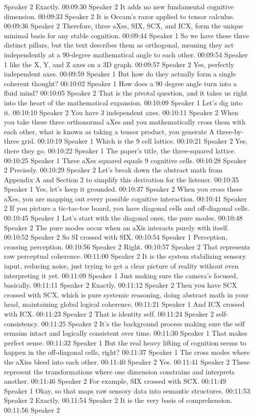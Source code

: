 Speaker 2 Exactly. 00:09:30 Speaker 2 It adds no new fundamental cognitive dimension. 00:09:33 Speaker 2 It is Occam's razor applied to tensor calculus. 00:09:36 Speaker 2 Therefore, three aXes, SIX, SCX, and ICX, form the unique minimal basis for any stable cognition. 00:09:44 Speaker 1 So we have these three distinct pillars, but the text describes them as orthogonal, meaning they act independently at a 90-degree mathematical angle to each other. 00:09:54 Speaker 1 like the X, Y, and Z axes on a 3D graph. 00:09:57 Speaker 2 Yes, perfectly independent axes. 00:09:59 Speaker 1 But how do they actually form a single coherent thought? 00:10:02 Speaker 1 How does a 90 degree angle turn into a fluid mind? 00:10:05 Speaker 2 That is the pivotal question, and it takes us right into the heart of the mathematical expansion. 00:10:09 Speaker 1 Let's dig into it. 00:10:10 Speaker 2 You have 3 independent axes. 00:10:11 Speaker 2 When you take these three orthonormal aXes and you mathematically cross them with each other, what is known as taking a tensor product, you generate A three-by-three grid. 00:10:19 Speaker 1 Which is the 9 cell lattice. 00:10:21 Speaker 2 Yes, there they go. 00:10:22 Speaker 1 The paper's title, the three-squared lattice. 00:10:25 Speaker 1 Three aXes squared equals 9 cognitive cells. 00:10:28 Speaker 2 Precisely. 00:10:29 Speaker 2 Let's break down the abstract math from Appendix A and Section 2 to simplify this derivation for the listener. 00:10:35 Speaker 1 Yes, let's keep it grounded. 00:10:37 Speaker 2 When you cross these aXes, you are mapping out every possible cognitive interaction. 00:10:41 Speaker 2 If you picture a tic-tac-toe board, you have diagonal cells and off-diagonal cells. 00:10:45 Speaker 1 Let's start with the diagonal ones, the pure modes. 00:10:48 Speaker 2 The pure modes occur when an aXis interacts purely with itself. 00:10:52 Speaker 2 So SI crossed with SIX. 00:10:54 Speaker 1 Perception, crossing perception. 00:10:56 Speaker 2 Right. 00:10:57 Speaker 2 That represents raw perceptual coherence. 00:11:00 Speaker 2 It is the system stabilizing sensory input, reducing noise, just trying to get a clear picture of reality without even interpreting it yet. 00:11:09 Speaker 1 Just making sure the camera's focused, basically. 00:11:11 Speaker 2 Exactly. 00:11:12 Speaker 2 Then you have SCX crossed with SCX, which is pure systemic reasoning, doing abstract math in your head, maintaining global logical coherence. 00:11:21 Speaker 1 And ICX crossed with ICX. 00:11:23 Speaker 2 That is identity self. 00:11:24 Speaker 2 self-consistency. 00:11:25 Speaker 2 It's the background process making sure the self remains intact and logically consistent over time. 00:11:30 Speaker 1 That makes perfect sense. 00:11:32 Speaker 1 But the real heavy lifting of cognition seems to happen in the off-diagonal cells, right? 00:11:37 Speaker 1 The cross modes where the aXiss bleed into each other. 00:11:40 Speaker 2 Yes. 00:11:41 Speaker 2 These represent the transformations where one dimension constrains and interprets another. 00:11:46 Speaker 2 For example, SIX crossed with SCX. 00:11:49 Speaker 1 Okay, so that maps raw sensory data into semantic structures. 00:11:53 Speaker 2 Exactly. 00:11:54 Speaker 2 It is the very basis of comprehension. 00:11:56 Speaker 2 